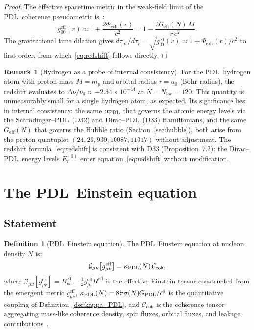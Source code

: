 \documentclass[11pt,a4paper]{article}
\theoremstyle{definition}
\newtheorem{definition}[theorem]{Definition}
\newtheorem{remark}[theorem]{Remark}
\newcommand{\PDL}{\textnormal{PDL}}
\newcommand{\aPDL}{\alpha_{\PDL}}
\newcommand{\GPDL}{G_{\PDL}}
\newcommand{\Geff}{G_{\mathrm{eff}}}
\newcommand{\sig}{\sigma}
\newcommand{\kPDL}{\kappa_{\PDL}}
\newcommand{\Ccoh}{\mathcal{C}_{\mathrm{coh}}}
\newcommand{\geff}{g^{\mathrm{eff}}_{\mu\nu}}
\newcommand{\Gcal}{\mathcal{G}_{\mu\nu}}
\newcommand{\Phicoh}{\Phi_{\mathrm{coh}}}
\begin{document}
\begin{proof}
The effective spacetime metric in the weak-field limit of the \PDL\ coherence pseudometric is~\cite{Einstein_Dirac_PDL_2026,PDL_Main_2026}:
\begin{equation}
g_{00}^{\mathrm{eff}}(r) \approx 1 + \frac{2\Phicoh(r)}{c^2} = 1 - \frac{2\Geff(N)\,M}{r\,c^2}.
\label{eq:g00}
\end{equation}
The gravitational time dilation gives $d\tau_\infty/d\tau_r = \sqrt{g_{00}^{\mathrm{eff}}(r)} \approx 1 + \Phicoh(r)/c^2$ to first order, from which~\eqref{eq:redshift} follows directly.
\end{proof}

\begin{remark}[Hydrogen as a probe of internal consistency]
For the \PDL\ hydrogen atom with proton mass $M = m_p$ and orbital radius $r = a_0$ (Bohr radius), the redshift evaluates to $\Delta\nu/\nu_0 \approx -2.34\times10^{-44}$ at $N = N_{\mathrm{loc}} = 120$. This quantity is unmeasurably small for a single hydrogen atom, as expected. Its significance lies in internal consistency: the same $\aPDL$ that governs the atomic energy levels via the Schr\"odinger--\PDL\ (D32) and Dirac--\PDL\ (D33) Hamiltonians, and the same $\Geff(N)$ that governs the Hubble ratio (Section~\ref{sec:hubble}), both arise from the proton quintuplet $(24, 28, 930, 10087, 11017)$ without adjustment. The redshift formula~\eqref{eq:redshift} is consistent with D33 (Proposition~7.2): the Dirac--\PDL\ energy levels $E_n^{(0)}$ enter equation~\eqref{eq:redshift} without modification.
\end{remark}

\section{The \PDL\ Einstein equation}
\label{sec:einstein_eq}

\subsection{Statement}

\begin{definition}[\PDL\ Einstein equation]
\label{def:einstein_eq}
The \PDL\ Einstein equation at nucleon density $N$ is:
\begin{equation}
\Gcal\!\left[\geff\right] = \kPDL(N)\,\Ccoh,
\label{eq:Einstein_PDL}
\end{equation}
where $\Gcal[\geff] = R_{\mu\nu}^{\mathrm{eff}} - \tfrac{1}{2}g_{\mu\nu}^{\mathrm{eff}} R^{\mathrm{eff}}$ is the effective Einstein tensor constructed from the emergent metric $\geff$, $\kPDL(N) = 8\pi\sig(N)\GPDL/c^4$ is the quantitative coupling of Definition~\ref{def:kappa_PDL}, and $\Ccoh$ is the coherence tensor aggregating mass-like coherence density, spin fluxes, orbital fluxes, and leakage contributions~\cite{Einstein_Dirac_PDL_2026}.
\end{definition}
\end{document}
